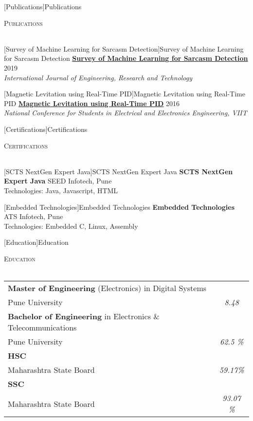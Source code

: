 \documentclass[a4paper]{article}
\newcommand{\lineunder} {
    \vspace*{-8pt} \\
    \hspace*{-18pt} \hrulefill \\
}
\newcommand{\header} [1] {
    {\hspace*{-18pt}\vspace*{6pt} \textsc{#1}}
    \vspace*{-6pt} \lineunder
}
\begin{document}
[Publications]{Publications}
\header{Publications}
\vspace{1mm}

[Survey of Machine Learning for Sarcasm Detection]{Survey of Machine Learning for Sarcasm Detection}
{\textbf{\href{https://www.ijert.org/survey-of-machine-learning-for-sarcasm-detection}{Survey of Machine Learning for Sarcasm Detection}}} \hfill 2019\\
\textit{International Journal of Engineering, Research and Technology} \\
\vspace*{2mm}

[Magnetic Levitation using Real-Time PID]{Magnetic Levitation using Real-Time PID}
{\textbf{\href{https://ijrat.org/downloads/Conference_Proceedings/ncseee2016/ncseee-15.pdf}{Magnetic Levitation using Real-Time PID}}} \hfill 2016\\
\textit{National Conference for Students in Electrical and Electronics Engineering, VIIT} \\
\vspace*{2mm}

[Certifications]{Certifications}
\header{Certifications}
\vspace{1mm}

[SCTS NextGen Expert Java]{SCTS NextGen Expert Java}
\textbf{SCTS NextGen Expert Java} \hfill SEED Infotech, Pune\\
Technologies: Java, Javascript, HTML\\
\vspace*{2mm}

[Embedded Technologies]{Embedded Technologies}
\textbf{Embedded Technologies} \hfill ATS Infotech, Pune\\
Technologies: Embedded C, Linux, Assembly\\
\vspace*{2mm}

[Education]{Education}
\header{Education}
\vspace{1mm}
\bgroup
\def\arraystretch{1.2}
\begin{tabularx}{\textwidth}{ | X | c | }
  \hline

\textbf{Master of Engineering} (Electronics) in Digital Systems & \\
Pune University & \textit{8.48} \\
  \hline

\textbf{Bachelor of Engineering} in Electronics \& Telecommunications & \\
Pune University & \textit{62.5 \%} \\
  \hline

\textbf{HSC} &\\
Maharashtra State Board & \textit{59.17\%}  \\
  \hline

  \textbf{SSC} & \\
Maharashtra State Board & \textit{93.07 \%} \\
  \hline

\end{tabularx}
\egroup
\vspace{2mm}
\end{document}
